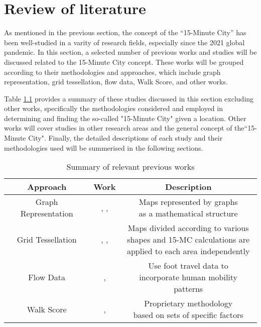 \chapter{Review of literature} \label{review}

As mentioned in the previous section, the concept of the ``15-Minute City'' has been well-studied in a varity of research fields, especially since the 2021 global pandemic. In this section, a selected number of previous works and studies will be discussed related to the 15-Minute City concept. These works will be grouped according to their methodologies and approaches, which include graph representation, grid tessellation, flow data, Walk Score, and other works.

Table \ref{tab:previous_works} provides a summary of these studies discussed in this section excluding other works, specifically the methodologies considered and employed in determining and finding the so-called "15-Minute City" given a location. Other works will cover studies in other research areas and the general concept of the``15-Minute City". Finally, the detailed descriptions of each study and their methodologies used will be summerised in the following sections.

\begin{table}[htbp]
    \begin{center}
        \caption{Summary of relevant previous works}
        \label{tab:previous_works}
        \begin{tabular}{ ccc }
            \hline
            \textbf{Approach} & \textbf{Work} & \textbf{Description} \\
            \hline
            \hline
            Graph Representation & \makecell{\cite{barbieri_graph_2023}, \cite{caselli_exploring_2022},\\\cite{rhoads_inclusive_2023}} & \makecell{Maps represented by graphs\\as a mathematical structure}\\
            \hline
            Grid Tessellation & \makecell{\cite{gaglione_urban_2022}, \cite{olivari_are_2023},\\\cite{Pezzica_Altafini_Mara_Chioni_2024}} & \makecell{Maps divided according to various\\shapes and 15-MC calculations are\\applied to each area independently} \\
            \hline
            Flow Data & \cite{zhang_towards_2023}, \cite{sarkar_measuring_2020} & \makecell{Use foot travel data to\\incorporate human mobility patterns} \\
            \hline
            Walk Score & \cite{walkscore}, \cite{weng_15-minute_2019} & \makecell{Proprietary methodology\\based on sets of specific factors} \\
            \hline
        \end{tabular}
    \end{center}
\end{table}


